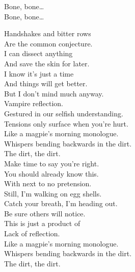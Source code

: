 Bone, bone… \\
Bone, bone… \\





Handshakes and bitter rows \\
Are the common conjecture. \\
I can dissect anything \\
And save the skin for later. \\

I know it's just a time \\
And things will get better. \\
But I don't mind much anyway. \\
Vampire reflection. \\

Gestured in our selfish understanding. \\
Tensions only surface when you're hurt. \\
Like a magpie's morning monologue. \\
Whispers bending backwards in the dirt. \\
The dirt, the dirt. \\

Make time to say you're right. \\
You should already know this. \\
With next to no pretension. \\
Still, I'm walking on egg shells. \\

Catch your breath, I'm heading out. \\
Be sure others will notice. \\
This is just a product of \\
Lack of reflection. \\

Like a magpie's morning monologue. \\
Whispers bending backwards in the dirt. \\
The dirt, the dirt. \\




